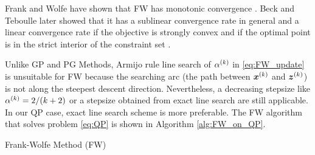 Frank and Wolfe have shown that FW has monotonic convergence
\cite{FRANKWOLFE_AN_ALGO_FOR_QUAD_PRGM}.
Beck and Teboulle later showed that it has a sublinear convergence rate in
general and a linear convergence rate if the objective is strongly convex and
if the optimal point is in the strict interior of the constraint set
\cite{COND_GRAD_LIN_CONVERG_RATE_BECK2004}.

Unlike GP and PG Methods, Armijo rule line search of $\alpha^{(k)}$ in
\eqref{eq:FW_update} is unsuitable for FW because the searching arc (the path
between $\bm x^{(k)}$ and $\bm z^{(k)}$) is not along the steepest descent
direction.
Nevertheless, a decreasing stepsize like $\alpha^{(k)} = 2/(k+2)$ or a
stepsize obtained from exact line search are still applicable.
In our QP case, exact line search scheme is more preferable.
The FW algorithm that solves problem \eqref{eq:QP} is shown in Algorithm
\ref{alg:FW_on_QP}.

\begin{algorithm}
    \caption{Frank-Wolfe Method (FW)}
    \label{alg:FW_on_QP}
    \begin{algorithmic}[1]
        \smallskip
            \smallskip
            \smallskip
            \smallskip
            \smallskip
            \smallskip
        \EndFor
        \smallskip
    \end{algorithmic}
\end{algorithm}

